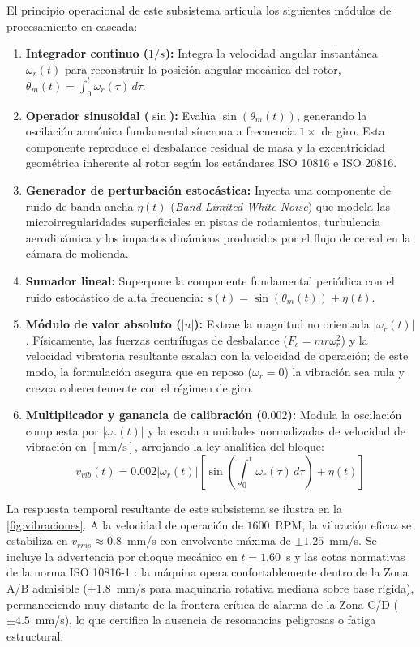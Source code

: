 \documentclass[conference]{IEEEtran}
\begin{document}
El principio operacional de este subsistema articula los siguientes módulos de procesamiento en cascada:
\begin{enumerate}
    \item \textbf{Integrador continuo ($1/s$):} Integra la velocidad angular instantánea $\omega_r(t)$ para reconstruir la posición angular mecánica del rotor, $\theta_m(t) = \int_0^t \omega_r(\tau)\,d\tau$.
    \item \textbf{Operador sinusoidal ($\sin$):} Evalúa $\sin(\theta_m(t))$, generando la oscilación armónica fundamental síncrona a frecuencia $1\times$ de giro. Esta componente reproduce el desbalance residual de masa y la excentricidad geométrica inherente al rotor según los estándares ISO 10816 e ISO 20816.
    \item \textbf{Generador de perturbación estocástica:} Inyecta una componente de ruido de banda ancha $\eta(t)$ (\textit{Band-Limited White Noise}) que modela las microirregularidades superficiales en pistas de rodamientos, turbulencia aerodinámica y los impactos dinámicos producidos por el flujo de cereal en la cámara de molienda.
    \item \textbf{Sumador lineal:} Superpone la componente fundamental periódica con el ruido estocástico de alta frecuencia: $s(t) = \sin(\theta_m(t)) + \eta(t)$.
    \item \textbf{Módulo de valor absoluto ($|u|$):} Extrae la magnitud no orientada $|\omega_r(t)|$. Físicamente, las fuerzas centrífugas de desbalance ($F_c = m r \omega_r^2$) y la velocidad vibratoria resultante escalan con la velocidad de operación; de este modo, la formulación asegura que en reposo ($\omega_r = 0$) la vibración sea nula y crezca coherentemente con el régimen de giro.
    \item \textbf{Multiplicador y ganancia de calibración ($0.002$):} Modula la oscilación compuesta por $|\omega_r(t)|$ y la escala a unidades normalizadas de velocidad de vibración en $[\text{mm/s}]$, arrojando la ley analítica del bloque:
    \begin{equation}
        v_{vib}(t) = 0.002 |\omega_r(t)| \left[ \sin\left(\int_0^t \omega_r(\tau)\,d\tau\right) + \eta(t) \right]
        \label{eq:vibraciones_simulink}
    \end{equation}
\end{enumerate}

La respuesta temporal resultante de este subsistema se ilustra en la \autoref{fig:vibraciones}. A la velocidad de operación de $1600$~RPM, la vibración eficaz se estabiliza en $v_{rms} \approx 0.8$~mm/s con envolvente máxima de $\pm 1.25$~mm/s. Se incluye la advertencia por choque mecánico en $t = 1.60$~s y las cotas normativas de la norma ISO 10816-1 \cite{iso10816}: la máquina opera confortablemente dentro de la Zona A/B admisible ($\pm 1.8$~mm/s para maquinaria rotativa mediana sobre base rígida), permaneciendo muy distante de la frontera crítica de alarma de la Zona C/D ($\pm 4.5$~mm/s), lo que certifica la ausencia de resonancias peligrosas o fatiga estructural.
\end{document}
